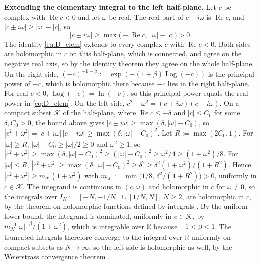 \documentclass[12pt]{article}
\newcommand{\re}{\operatorname{Re}}
\newcommand{\R}{\mathbb{R}}
\begin{document}
\textbf{Extending the elementary integral to the left half-plane.} Let $c$ be complex with $\re c<0$ and let $\omega$ be real. The real part of $c\pm i\omega$ is $\re c$, and
$|c\pm i\omega|\ge|\omega|-|c|$, so
\begin{equation*}
    |c\pm i\omega|\ge\max\bigl(-\re c,\;|\omega|-|c|\bigr)>0 .
\end{equation*}
The identity \eqref{eq:D_elem} extends to every complex $c$ with $\re c<0$. Both sides are holomorphic in $c$ on this
half-plane, which is connected, and agree on the negative real axis, so by the identity theorem \href{https://press.princeton.edu/books/paperback/9780691113852/complex-analysis}{\citep[Ch.~2]{SteinShakarchi2003}} they agree on
the whole half-plane. On the right side, $(-c)^{-1-\beta}:=\exp(-(1+\beta)\operatorname{Log}(-c))$ is the principal power of $-c$, which is
holomorphic there because $-c$ lies in the right half-plane. For real $c<0$, $\operatorname{Log}(-c)=\ln(-c)$, so this principal power
equals the real power in \eqref{eq:D_elem}. On the left side, $c^2+\omega^2=(c+i\omega)(c-i\omega)$. On a compact subset $\mathcal{K}$ of the half-plane, where
$\re c\le-\delta$ and $|c|\le C_0$ for some $\delta,C_0>0$, the bound above gives
$|c\pm i\omega|\ge\max(\delta,|\omega|-C_0)$, so $|c^2+\omega^2|=|c+i\omega|\,|c-i\omega|\ge\max(\delta,|\omega|-C_0)^2$. Let
$R:=\max(2C_0,1)$. For $|\omega|\ge R$, $|\omega|-C_0\ge|\omega|/2\ge0$ and $\omega^2\ge1$, so
$|c^2+\omega^2|\ge\max(\delta,|\omega|-C_0)^2\ge(|\omega|-C_0)^2\ge\omega^2/4\ge(1+\omega^2)/8$. For $|\omega|\le R$,
$|c^2+\omega^2|\ge\max(\delta,|\omega|-C_0)^2\ge\delta^2\ge\delta^2(1+\omega^2)/(1+R^2)$. Hence
$|c^2+\omega^2|\ge m_{\mathcal{K}}(1+\omega^2)$ with $m_{\mathcal{K}}:=\min\bigl(1/8,\,\delta^2/(1+R^2)\bigr)>0$, uniformly in $c\in\mathcal{K}$. The integrand is continuous in $(c,\omega)$ and holomorphic in $c$ for $\omega\neq0$, so the integrals over
$I_N:=[-N,-1/N]\cup[1/N,N]$, $N\ge2$, are holomorphic in $c$, by the theorem on holomorphic functions defined by integrals \href{https://press.princeton.edu/books/paperback/9780691113852/complex-analysis}{\citep[Ch.~2]{SteinShakarchi2003}}. By the uniform lower bound, the integrand is dominated, uniformly in $c\in\mathcal{K}$, by
$m_{\mathcal{K}}^{-1}|\omega|^{-\beta}/(1+\omega^2)$, which is integrable over $\R$ because $-1<\beta<1$. The truncated integrals therefore
converge to the integral over $\R$ uniformly on compact subsets as $N\to\infty$, so the left side is holomorphic as well,
by the Weierstrass convergence theorem \href{https://press.princeton.edu/books/paperback/9780691113852/complex-analysis}{\citep[Ch.~2]{SteinShakarchi2003}}.
\end{document}

